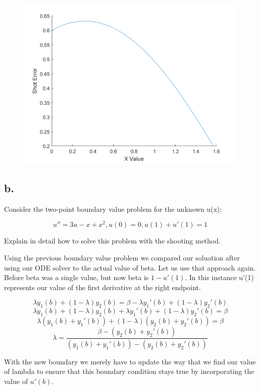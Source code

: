 \documentclass[]{article}
\begin{document}
\begin{figure}
\centering
\includegraphics{./ShootingErr1.png}
\caption{}
\end{figure}

\subsection{b.}\label{b.}

Consider the two-point boundary value problem for the unknown u(x):

\[u'' = 3u - x + x^2, u(0) = 0, u(1) + u'(1) = 1\]

Explain in detail how to solve this problem with the shooting method.

Using the previous boundary value problem we compared our soluation
after using our ODE solver to the actual value of beta. Let us use that
approach again. Before beta was a single value, but now beta is
\(1 - u'(1)\). In this instance u'(1) represents our value of the first
derivative at the right endpoint.

\[\lambda y_1(b) + (1-\lambda)y_2(b) = \beta - \lambda y_1'(b) + (1-\lambda)y_2'(b)\]
\[\lambda y_1(b) + (1-\lambda)y_2(b) + \lambda y_1'(b) + (1-\lambda)y_2'(b) = \beta\]
\[\lambda (y_1(b) + y_1'(b)) + (1-\lambda)(y_2(b)+y_2'(b)) = \beta\]
\[\lambda = \frac{\beta - (y_2(b)+y_2'(b))}{(y_1(b) + y_1'(b)) - (y_2(b)+y_2'(b))}\]

With the new boundary we merely have to update the way that we find our
value of lambda to ensure that this boundary condition stays true by
incorporating the value of \(u'(b)\).
\end{document}
